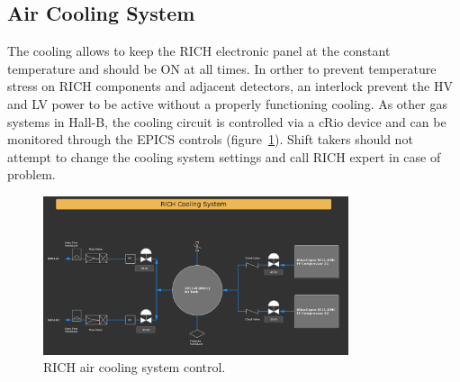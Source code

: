 \documentclass[12pt]{article}
\begin{document}



\subsection{Air Cooling System}
The cooling allows to keep the RICH electronic panel at the constant temperature and should be ON at all times. 
In orther to prevent temperature stress on RICH components and adjacent detectors, an interlock prevent the HV and LV power to be active without 
a properly functioning cooling. As other gas systems in Hall-B, the cooling circuit is controlled via a cRio device  and can be monitored through the EPICS controls (figure~\ref{AIR_gas}).
Shift takers should not attempt to change the cooling system settings and call RICH expert 
in case of problem.  %

\begin{figure}[htbp]
\center
\includegraphics[width=0.80\textwidth]{Justin_plots/GasCooling.PNG}
\caption{ \label{AIR_gas} RICH air cooling system control.}
\end{figure}

\end{document}
